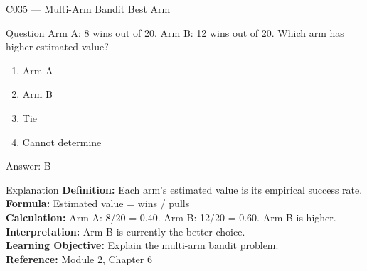 \documentclass[aspectratio=169,8pt]{beamer}
\begin{document}
	\begin{frame}{C035 --- Multi-Arm Bandit Best Arm}
		\begin{block}{Question}
			Arm A: 8 wins out of 20. Arm B: 12 wins out of 20. Which arm has higher estimated value?
			\begin{enumerate}
				\item Arm A
				\item Arm B
				\item Tie
				\item Cannot determine
			\end{enumerate}
		\end{block}
		\begin{exampleblock}{Answer: B}\end{exampleblock}
		\begin{block}{Explanation}
			\textbf{Definition:} Each arm's estimated value is its empirical success rate.\\
			\textbf{Formula:} Estimated value = wins / pulls\\
			\textbf{Calculation:} Arm A: 8/20 = 0.40. Arm B: 12/20 = 0.60. Arm B is higher.\\
			\textbf{Interpretation:} Arm B is currently the better choice.\\
			\textbf{Learning Objective:} Explain the multi-arm bandit problem.\\
			\textbf{Reference:} Module 2, Chapter 6
		\end{block}
	\end{frame}
	
\end{document}
